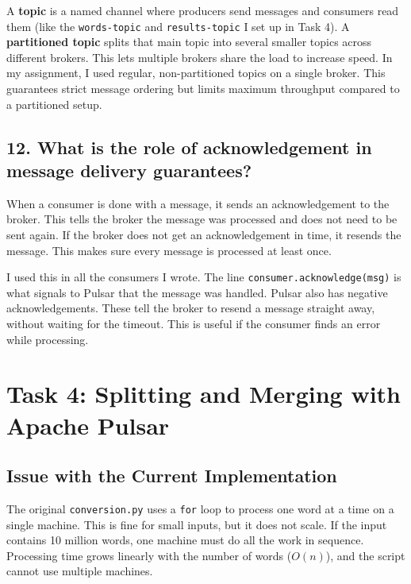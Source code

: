 \documentclass[11pt,a4paper]{article}
\begin{document}
A \textbf{topic} is a named channel where producers send messages and consumers read them (like the \texttt{words-topic} and \texttt{results-topic} I set up in Task 4).
A \textbf{partitioned topic} splits that main topic into several smaller topics across different brokers. 
This lets multiple brokers share the load to increase speed. In my assignment, I used regular, non-partitioned topics on a single broker. 
This guarantees strict message ordering but limits maximum throughput compared to a partitioned setup.

\subsection*{12. What is the role of acknowledgement in message delivery guarantees?}

When a consumer is done with a message, it sends an acknowledgement to the broker. This
tells the broker the message was processed and does not need to be sent again. If the
broker does not get an acknowledgement in time, it resends the message. This makes sure
every message is processed at least once.

I used this in all the consumers I wrote. The line \texttt{consumer.acknowledge(msg)}
is what signals to Pulsar that the message was handled. Pulsar also has negative
acknowledgements. These tell the broker to resend a message straight away, without
waiting for the timeout. This is useful if the consumer finds an error while processing.

\section{Task 4: Splitting and Merging with Apache Pulsar}

\subsection{Issue with the Current Implementation}

The original \texttt{conversion.py} uses a \texttt{for} loop to process one word at a time
on a single machine. This is fine for small inputs, but it does not scale. If the input
contains 10 million words, one machine must do all the work in sequence. Processing time
grows linearly with the number of words ($O(n)$), and the script cannot use multiple
machines.
\end{document}
